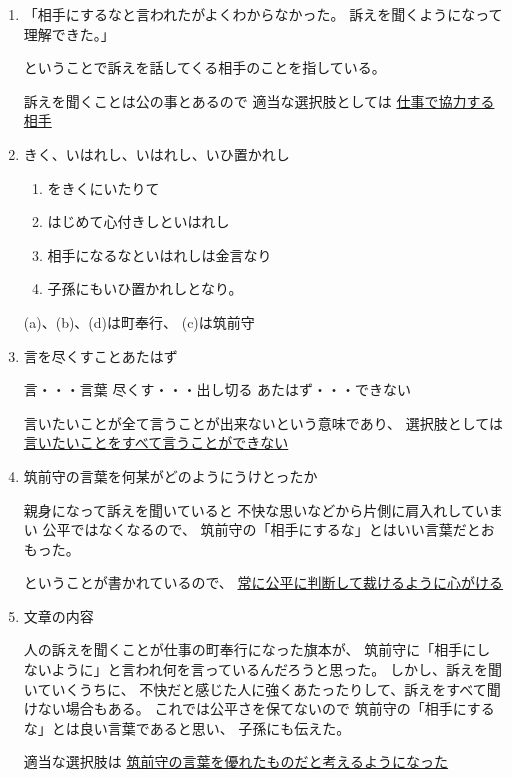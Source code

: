 \documentclass[10pt,b5paper]{ltjsarticle}
\begin{document}
\begin{enumerate}\renewcommand{\theenumi}{(\arabic{enumi})}
 \item
      「相手にするなと言われたがよくわからなかった。
      訴えを聞くようになって理解できた。」

      ということで訴えを話してくる相手のことを指している。

      訴えを聞くことは公の事とあるので
%
      適当な選択肢としては
      \underline{仕事で協力する相手}

 \item きく、いはれし、いはれし、いひ置かれし

       \begin{enumerate}
        \item {}をきくにいたりて

        \item はじめて心付きしといはれし

        \item 相手になるなといはれしは金言なり

        \item 子孫にもいひ置かれしとなり。
       \end{enumerate}

       (a)、(b)、(d)は町奉行、
       (c)は筑前守

 \item 言を尽くすことあたはず

       言・・・言葉
       \qquad
       尽くす・・・出し切る
       \qquad
       あたはず・・・できない

       言いたいことが全て言うことが出来ないという意味であり、
       選択肢としては\\
       \underline{言いたいことをすべて言うことができない}

 \item 筑前守の言葉を何某がどのようにうけとったか

       親身になって訴えを聞いていると
       不快な思いなどから片側に肩入れしていまい
       公平ではなくなるので、
       筑前守の「相手にするな」とはいい言葉だとおもった。

       ということが書かれているので、
       \underline{常に公平に判断して裁けるように心がける}

 \item 文章の内容

       人の訴えを聞くことが仕事の町奉行になった旗本が、
       筑前守に「相手にしないように」と言われ何を言っているんだろうと思った。
       しかし、訴えを聞いていくうちに、
       不快だと感じた人に強くあたったりして、訴えをすべて聞けない場合もある。
       これでは公平さを保てないので
       筑前守の「相手にするな」とは良い言葉であると思い、
       子孫にも伝えた。

       適当な選択肢は
       \underline{筑前守の言葉を優れたものだと考えるようになった}
\end{enumerate}
\end{document}
